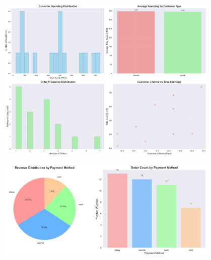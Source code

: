 \documentclass[11pt,a4paper]{article}
\begin{document}
\begin{figure}[h]
\centering
\includegraphics[width=0.95\textwidth]{../charts/customer_analysis.png}
\end{figure}

\begin{figure}[h]
\centering
\includegraphics[width=0.95\textwidth]{../charts/payment_methods.png}
\end{figure}
\end{document}
